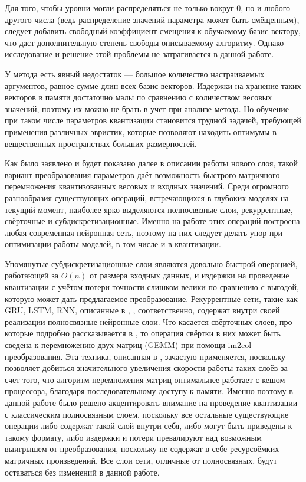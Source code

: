 Для того, чтобы уровни могли распределяться не только вокруг $0$, но и любого другого числа (ведь распределение значений параметра может быть смёщенным), следует добавить свободный коэффициент смещения к обучаемому базис-вектору, что даст дополнительную степень свободы описываемому алгоритму. Однако исследование и решение этой проблемы не затрагивается в данной работе.

У метода есть явный недостаток — большое количество настраиваемых аргументов, равное сумме длин всех базис-векторов. Издержки на хранение таких векторов в памяти достаточно малы по сравнению с количеством весовых значений, поэтому их можно не брать в учет при анализе метода. Но обучение  при таком числе параметров квантизации становится трудной задачей, требующей применения различных эвристик, которые позволяют находить оптимумы в вещественных пространствах больших размерностей.

Как было заявлено и будет показано далее в описании работы нового слоя, такой вариант преобразования параметров даёт возможность быстрого матричного перемножения квантизованных весовых и входных значений. Среди огромного разнообразия существующих операций, встречающихся в глубоких моделях на текущий момент, наиболее ярко выделяются полносвязные слои, рекуррентные, свёрточные и субдискретизационные. Именно на работе этих операций построена любая современная нейронная сеть, поэтому на них следует делать упор при оптимизации работы моделей, в том числе и в квантизации. 

Упомянутые субдискретизационные слои являются довольно быстрой операцией, работающей за $O(n)$ от размера входных данных, и издержки на проведение квантизации с учётом потери точности слишком велики по сравнению с выгодой, которую может дать предлагаемое преобразование. Рекуррентные сети, такие как GRU, LSTM, RNN, описанные в \cite{gru}, \cite{lstm}, \cite{rnn} соответственно, содержат внутри своей реализации полносвязные нейронные слои. Что касается свёрточных слоев, про которые подробно рассказывается в \cite{conv}, то операция свёртки в них может быть сведена к перемножению двух матриц (GEMM) при помощи im2col преобразования. Эта техника, описанная в \cite{im2col}, зачастую применяется, поскольку позволяет добиться значительного увеличения скорости работы таких слоёв за счет того, что алгоритм перемножения матриц оптимальнее работает с кешом процессора, благодаря последовательному доступу к памяти.  Именно поэтому в данной работе было решено акцентировать внимание на проведение квантизации с классическим полносвязным слоем, поскольку все остальные существующие операции либо содержат такой слой внутри себя, либо могут быть приведены к такому формату, либо издержки и потери превалируют над возможным выигрышем от преобразования, поскольку не содержат в себе ресурсоёмких матричных произведений. Все слои сети, отличные от полносвязных, будут оставаться без изменений в данной работе.

